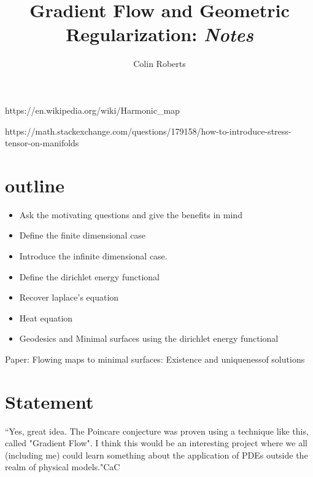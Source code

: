 \documentclass[12pt]{report} %
\title{Gradient Flow and Geometric Regularization: \emph{Notes}}
\author{Colin Roberts}
\theoremstyle{definition}
\begin{document}
\maketitle

https://en.wikipedia.org/wiki/Harmonic_map

https://math.stackexchange.com/questions/179158/how-to-introduce-stress-tensor-on-manifolds

\section{outline}


\begin{itemize}
    \item Ask the motivating questions and give the benefits in mind
    \item Define the finite dimensional case
    \item Introduce the infinite dimensional case.
    \item Define the dirichlet energy functional
    \item Recover laplace's equation
    \item Heat equation
    \item Geodesics and Minimal surfaces using the dirichlet energy functional
\end{itemize}

Paper: Flowing maps to minimal surfaces: Existence and uniquenessof solutions

\section{Statement}

``Yes, great idea. The Poincare conjecture was proven using a technique
like this, called "Gradient Flow". I think this would be an interesting
project where we all (including me) could learn something about the
application of PDEs outside the realm of physical models."CaC
\end{document}
